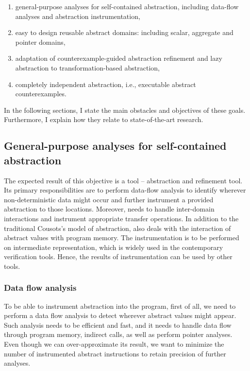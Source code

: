 \begin{enumerate}
    \item general-purpose analyses for self-contained abstraction, including
        data-flow analyses and abstraction instrumentation,
    \item easy to design reusable abstract domains: including scalar, aggregate
        and pointer domains,
    \item adaptation of counterexample-guided abstraction refinement and
        lazy abstraction to transformation-based abstraction,
    \item completely independent abstraction, i.e., executable abstract counterexamples.
\end{enumerate}

\noindent
In the following sections, I state the main obstacles and objectives of
these goals. Furthermore, I explain how they relate to state-of-the-art
research.

\subsection{General-purpose analyses for self-contained abstraction}

The expected result of this objective is a tool \lart{} -- \llvm abstraction and
refinement tool. Its primary responsibilities are to perform data-flow analysis
to identify wherever non-deterministic data might occur and further instrument
a provided abstraction to those locations. Moreover, \lart needs to handle
inter-domain interactions and instrument appropriate transfer operations. In
addition to the traditional Cousots's model of abstraction, \lart also deals
with the interaction of abstract values with program memory. The
instrumentation is to be performed on \llvm intermediate representation, which
is widely used in the contemporary verification tools. Hence, the results of
instrumentation can be used by other tools.

\subsubsection{Data flow analysis}

To be able to instrument abstraction into the program, first of all, we need to
perform a data flow analysis to detect wherever abstract values might appear.
Such analysis needs to be efficient and fast, and it needs to handle data flow
through program memory, indirect calls, as well as perform pointer analyses. Even though we can
over-approximate its result, we want to minimize the number of instrumented
abstract instructions to retain precision of further analyses.

